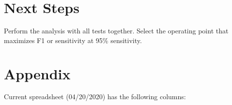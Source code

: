 \documentclass[]{article}
\begin{document}



\section{Next Steps}
\noindent Perform the analysis with all tests together. Select the operating point that maximizes F1 or sensitivity at 95\%
sensitivity. \\  




\section{Appendix}

\noindent Current spreadsheet (04/20/2020) has the following columns: \\
\end{document}
